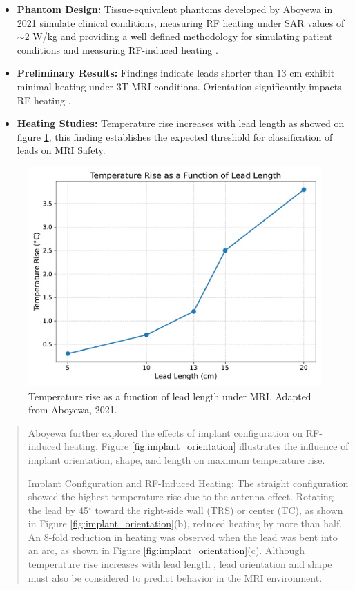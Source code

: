 \documentclass[final]{article}
\newcommand{\boldtext}[1]{{\fontseries{b}\selectfont #1}}
\begin{document}
\begin{multicols}{3}
\begin{itemize}
    \item \textbf{Phantom Design:} Tissue-equivalent phantoms developed by Aboyewa in 2021 simulate clinical conditions, measuring RF heating under SAR values of $\sim$2 W/kg and providing a well defined methodology for simulating patient conditions and measuring RF-induced heating \cite{aboyewa2021}.
    \item \textbf{Preliminary Results:} Findings indicate leads shorter than 13 cm exhibit minimal heating under 3T MRI conditions. Orientation significantly impacts RF heating \cite{aboyewa2021}.
    \item \textbf{Heating Studies:} Temperature rise increases with lead length as showed on figure \ref{fig:lead_temp_rise}, this finding establishes the expected threshold for classification of leads on MRI Safety.
\end{itemize}


\begin{figure}[H]
    \centering
    \includegraphics[width=0.6\linewidth]{FigTab.pdf} %
    \caption{Temperature rise as a function of lead length under MRI. Adapted from Aboyewa, 2021.}
    \label{fig:lead_temp_rise}
\end{figure}

\begin{quote}
Aboyewa further explored the effects of implant configuration on RF-induced heating. Figure \ref{fig:implant_orientation} illustrates the influence of implant orientation, shape, and length on maximum temperature rise.

\boldtext{Implant Configuration and RF-Induced Heating:} 
The straight configuration showed the highest temperature rise due to the antenna effect. Rotating the lead by 45$^\circ$ toward the right-side wall (TRS) or center (TC), as shown in Figure \ref{fig:implant_orientation}(b), reduced heating by more than half. An 8-fold reduction in heating was observed when the lead was bent into an arc, as shown in Figure \ref{fig:implant_orientation}(c). Although temperature rise increases with lead length \cite{aboyewa2021}, lead orientation and shape must also be considered to predict behavior in the MRI environment.  
\end{quote}


\end{multicols}
\end{document}
